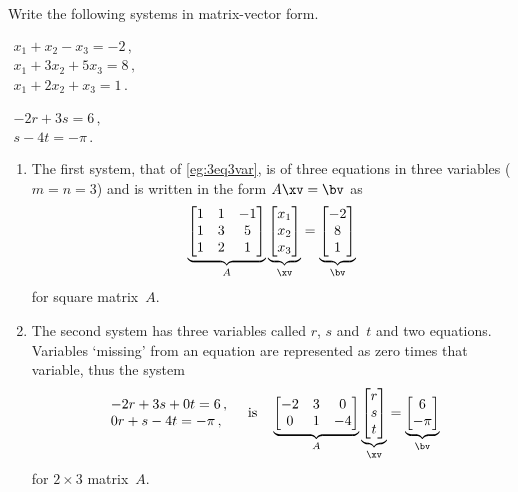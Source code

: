 \begin{example} \label{eg:matvecsys}
Write the following systems in matrix-vector form.
\begin{parts}
\item \(\begin{array}{l}
x_1+x_2-x_3=-2\,,\\
x_1+3x_2+5x_3=8\,,\\
x_1+2x_2+x_3=1\,.
\end{array}\)

\item \(\begin{array}{l} -2r+3s=6\,,\\s-4t=-\pi\,. \end{array}\)
\end{parts}
\begin{solution} 
\begin{enumerate}
\item The first system, that of \autoref{eg:3eq3var}, is of three equations in three variables (\(m=n=3\)) and is written in the form \(A\xv=\bv\) as
\begin{equation*}
\underbrace{\begin{bmatrix} 1&1&-1\\ 1&3&5\\1&2&1 \end{bmatrix}}_A
\underbrace{\begin{bmatrix} x_1\\x_2\\x_3 \end{bmatrix}}_\xv
=\underbrace{\begin{bmatrix} -2\\8\\1 \end{bmatrix}}_\bv 
\end{equation*}
for square matrix~\(A\).

\item The second system has three variables called \(r\), \(s\) and~\(t\) and two equations.
Variables `missing' from an equation are represented as zero times that variable, thus the system
\begin{equation*}
\begin{array}{l} -2r+3s+0t=6\,,\\0r+s-4t=-\pi\,, \end{array}
\quad\text{is}\quad
\underbrace{\begin{bmatrix} -2&3&0\\ 0&1&-4 \end{bmatrix}}_A
\underbrace{\begin{bmatrix} r\\s\\t \end{bmatrix}}_\xv
=\underbrace{\begin{bmatrix} 6\\-\pi \end{bmatrix}}_\bv 
\end{equation*}
for \(2\times3\) matrix~\(A\).
\end{enumerate}
\end{solution}
\end{example}



